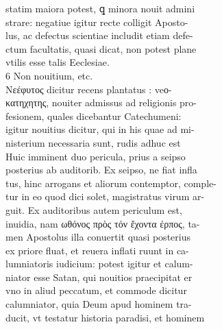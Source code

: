\documentclass{article}
\begin{document}
\begin{pages}
                statim maiora potest, ꝗ minora nouit admini \\
                strare: negatiue igitur recte colligit Aposto- \\
                lus, ac defectus scientiae includit etiam defe- \\
                ctum facultatis, quasi dicat, non potest plane \\
                vtilis esse talis Eeclesiae. \\
                6 Non nouitium, etc. \\
                Νεέφυτος dicitur recens plantatus : veο- \\
                κατηχητης, nouiter admissus ad religionis pro- \\
                fesionem, quales dicebantur Catechumeni: \\
                igitur nouitius dicitur, qui in his quae ad mi- \\
                nisterium necessaria sunt, rudis adhuc est \\
                Huic imminent duo pericula, prius a seipso \\
                posterius ab auditorib. Ex seipso, ne fiat infla \\
                tus, hinc arrogans et aliorum contemptor, comple- \\
                tur in eo quod dici solet, magistratus virum ar- \\
                guit. Ex auditoribus autem periculum est, \\
                inuidia, nam ωθόνος πρὸς τόν ἔχοντα έρπος, ta- \\
                men Apostolus illa conuertit quasi posterius \\
                ex priore fluat, et reuera inflati ruunt in ca- \\
                lumniatoris iudicium: potest igitur et calum- \\
                niator esse Satan, qui nouitios praecipitat er \\
                vno in aliud peccatum, et commode dicitur \\
                calumniator, quia Deum apud hominem tra- \\
                ducit, vt testatur historia paradisi, et hominem \\

\end{pages}
\end{document}
